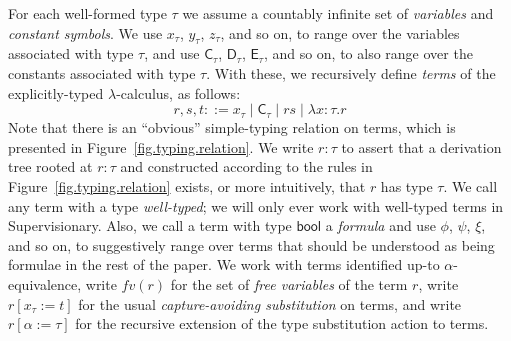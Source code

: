 \documentclass[a4paper, UKenglish, cleveref, autoref, thm-restate, colorlinks]{lipics-v2021}
\newcommand{\lam}[1]{\lambda{#1}.}
\begin{document}
For each well-formed type $\tau$ we assume a countably infinite set of \emph{variables} and \emph{constant symbols}.
We use $x_\tau$, $y_\tau$, $z_\tau$, and so on, to range over the variables associated with type $\tau$, and use $\mathsf{C}_\tau$, $\mathsf{D}_\tau$, $\mathsf{E}_\tau$, and so on, to also range over the constants associated with type $\tau$.
With these, we recursively define \emph{terms} of the explicitly-typed $\lambda$-calculus, as follows:
\begin{displaymath}
r, s, t ::= x_\tau \mid \mathsf{C}_\tau \mid rs \mid \lam{x{:}\tau}r
\end{displaymath}
Note that there is an ``obvious'' simple-typing relation on terms, which is presented in Figure~\ref{fig.typing.relation}.
We write $r : \tau$ to assert that a derivation tree rooted at $r : \tau$ and constructed according to the rules in Figure~\ref{fig.typing.relation} exists, or more intuitively, that $r$ has type $\tau$.
We call any term with a type \emph{well-typed}; we will only ever work with well-typed terms in Supervisionary.
Also, we call a term with type $\mathsf{bool}$ a \emph{formula} and use $\phi$, $\psi$, $\xi$, and so on, to suggestively range over terms that should be understood as being formulae in the rest of the paper.
We work with terms identified up-to $\alpha$-equivalence, write $fv(r)$ for the set of \emph{free variables} of the term $r$, write $r[x_\tau := t]$ for the usual \emph{capture-avoiding substitution} on terms, and write $r[\alpha := \tau]$ for the recursive extension of the type substitution action to terms.
\end{document}
